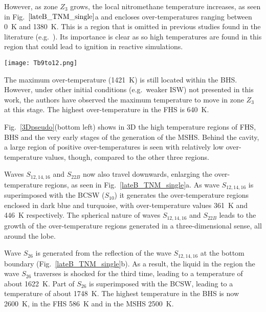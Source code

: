 \documentclass[3p,times,twocolumn]{elsarticle}
\begin{document}
However, as zone $Z_3$ grows, the local nitromethane temperature increases,
as  seen in Fig.\  $\ref{lateB_TNM_single}$a and encloses over-temperatures
ranging between \SI{0}{\kelvin} and \SI{1380}{\kelvin}. This is a region that is omitted in previous studies found in the literature (e.g.\ \cite{bourne2002cavity,bourne2003temperature}). Its importance is clear as so high temperatures are found in this region that could lead to ignition in reactive simulations.


\begin{figure*}
    \centering
\texttt{[image: Tb9to12.png]}
\caption{Temperature distribution of nitromethane on the central $xz$-plane
during late stages of the collapse. The
contours represent isotherms of over-temperature. The insets provide enlargements
of the Mach stem hot spot region. The horizontal axis
represents
$x$  and the vertical axis $z$, both  in \SI{}{\micro \meter}.}
\label{lateB_TNM_single}
\end{figure*}
The maximum over-temperature (\SI{1421}{\kelvin}) is still located within
the BHS. However, under other initial conditions (e.g.\ weaker ISW) not presented in this work, the authors have observed the maximum
temperature to move in zone $Z_3$ at this stage. The 
highest over-temperature in the FHS is \SI{640}{\kelvin}. 

Fig.\ \ref{3Dpseudo}(bottom left) shows in 3D the high temperature regions of FHS, BHS and the very early stages of the generation of the MSHS. Behind the cavity, a large region of positive over-temperatures is seen with relatively low over-temperature values, though, compared to the other three regions. 


Waves $S_{12,14,16}$ and $S_{22B}$ now also travel downwards,
enlarging the over-temperature regions, as seen in Fig.\  \ref{lateB_TNM_single}a.
As wave $S_{12,14,16}$ is superimposed with the BCSW ($S_{10}$) it generates the over-temperature
regions enclosed in dark blue and turquoise, with over-temperature values
\SI{361}{\kelvin} and \SI{446}{\kelvin} respectively. The spherical nature
of waves $S_{12,14,16}$ and $S_{22B}$ leads to the growth of the over-temperature
regions generated in a three-dimensional sense, all around the lobe. 

Wave $S_{26}$ is generated from the reflection of the wave $S_{12,14,16}$
at the bottom boundary (Fig.\ \ref{lateB_TNM_single}b). As a result, the
liquid in the region the wave $S_{26}$ traverses is shocked for the third
time, leading to a temperature of  about \SI{1622}{\kelvin}. Part of $S_{26}$
is superimposed with the BCSW, leading to a temperature of about \SI{1748}{\kelvin}.
The highest temperature in the BHS is now \SI{2600}{\kelvin}, in the FHS
\SI{586}{\kelvin} and in the MSHS \SI{2500}{\kelvin}. 
\end{document}
